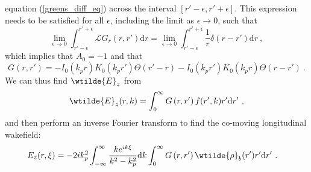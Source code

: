 equation (\ref{greens_diff_eq}) across the interval $\left[r'-\epsilon, r'+\epsilon \right]$. This expression needs to be satisfied for all $\epsilon$, including the limit as $\epsilon\to 0$, such that
\begin{equation}
\lim_{\epsilon\to 0}\int_{r'-\epsilon}^{r'+\epsilon}\mathscr{L}G_r(r,r')\mathrm{d}r= \lim_{\epsilon\to 0}\int_{r'-\epsilon}^{r'+\epsilon}\frac{1}{r}\delta(r-r')\mathrm{d}r~,
 \end{equation}
which implies that $A_0=-1$ and that
\begin{equation}
G\left(r,r'\right)=- I_0(k_pr)K_0(k_pr')\Theta(r'-r)-I_0(k_pr')K_0(k_pr)\Theta(r-r')~.
\end{equation}
We can thus find $\wtilde{E}_z$ from 
\begin{equation}
\wtilde{E}_z(r,k)=\int_{0}^{\infty}G\left(r,r'\right)f(r',k)r'\mathrm{d}r'~,
\end{equation}
and then perform an inverse Fourier transform to find the co-moving longitudinal wakefield:
\begin{align}
E_z(r,\xi)&=-{2ik_p^2}\int_{-\infty}^{\infty}\frac{ke^{ik\xi}}{k^2-k_p^2}\mathrm{d}k\int_0^{\infty}G\left(r,r'\right)\wtilde{\rho}_b(r')r'\mathrm{d}r'~.
\label{e_z}
\end{align}
